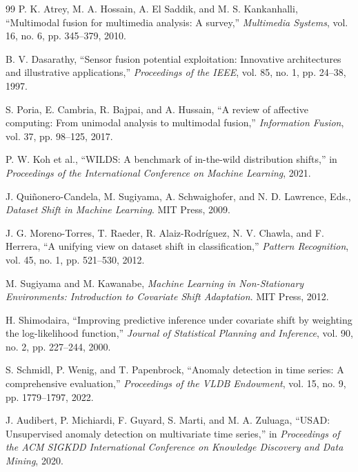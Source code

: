 \documentclass[10pt,conference]{IEEEtran}
\begin{document}
\begin{thebibliography}{99}
P. K. Atrey, M. A. Hossain, A. El Saddik, and M. S. Kankanhalli,
``Multimodal fusion for multimedia analysis: A survey,''
\emph{Multimedia Systems}, vol. 16, no. 6, pp. 345--379, 2010.

B. V. Dasarathy, ``Sensor fusion potential exploitation: Innovative
architectures and illustrative applications,'' \emph{Proceedings of the
IEEE}, vol. 85, no. 1, pp. 24--38, 1997.

S. Poria, E. Cambria, R. Bajpai, and A. Hussain, ``A review of affective
computing: From unimodal analysis to multimodal fusion,'' \emph{Information
Fusion}, vol. 37, pp. 98--125, 2017.

P. W. Koh et al., ``WILDS: A benchmark of in-the-wild distribution
shifts,'' in \emph{Proceedings of the International Conference on Machine
Learning}, 2021.

J. Qui\~nonero-Candela, M. Sugiyama, A. Schwaighofer, and N. D. Lawrence,
Eds., \emph{Dataset Shift in Machine Learning}. MIT Press, 2009.

J. G. Moreno-Torres, T. Raeder, R. Alaiz-Rodr\'iguez, N. V. Chawla, and
F. Herrera, ``A unifying view on dataset shift in classification,''
\emph{Pattern Recognition}, vol. 45, no. 1, pp. 521--530, 2012.

M. Sugiyama and M. Kawanabe, \emph{Machine Learning in Non-Stationary
Environments: Introduction to Covariate Shift Adaptation}. MIT Press,
2012.

H. Shimodaira, ``Improving predictive inference under covariate shift by
weighting the log-likelihood function,'' \emph{Journal of Statistical
Planning and Inference}, vol. 90, no. 2, pp. 227--244, 2000.

S. Schmidl, P. Wenig, and T. Papenbrock, ``Anomaly detection in time
series: A comprehensive evaluation,'' \emph{Proceedings of the VLDB
Endowment}, vol. 15, no. 9, pp. 1779--1797, 2022.

J. Audibert, P. Michiardi, F. Guyard, S. Marti, and M. A. Zuluaga,
``USAD: Unsupervised anomaly detection on multivariate time series,'' in
\emph{Proceedings of the ACM SIGKDD International Conference on
Knowledge Discovery and Data Mining}, 2020.


\end{thebibliography}
\end{document}
